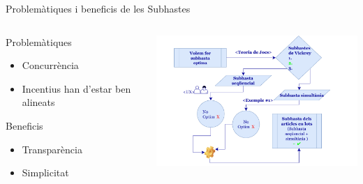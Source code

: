 \documentclass[twocolumn]{beamer}
\begin{document}
\begin{frame}{Problemàtiques i beneficis de les Subhastes}
\begin{columns}[t]
	\begin{column}{.3\textwidth}
		\begin{block}{Problemàtiques}
			\begin{itemize}
				\item Concurrència
				\item Incentius han d'estar ben alineats
			\end{itemize}
		\end{block}
		
		\begin{block}{Beneficis}
			\begin{itemize}
				\item Transparència
				\item Simplicitat
			\end{itemize}
		\end{block}
	\end{column}
	\begin{column}{.7\textwidth}
		
		\includegraphics[width=9cm]{subs}	 
		
	\end{column}
\end{columns}
\end{frame}
\end{document}
